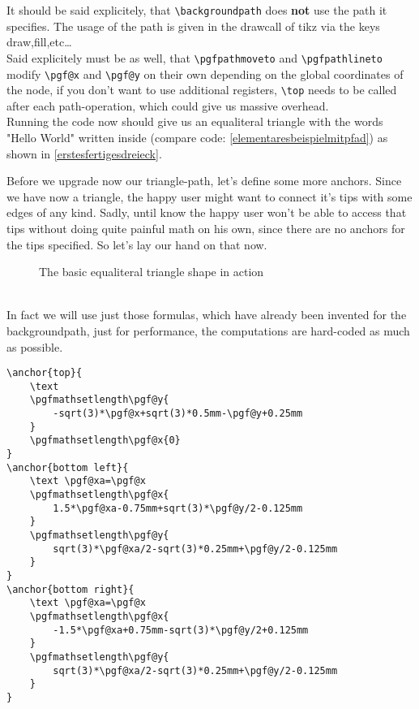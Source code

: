 \documentclass[12pt]{article}
\begin{document}
It should be said explicitely, that \lstinline!\backgroundpath! does \textbf{not} use the path it specifies. The usage of the path is given in the drawcall of tikz via the keys draw,fill,etc\ldots\\
Said explicitely must be as well, that \lstinline!\pgfpathmoveto! and \lstinline!\pgfpathlineto! modify \lstinline$\pgf@x$ and \lstinline$\pgf@y$ on their own depending on the global coordinates of the node, if you don't want to use additional registers, \lstinline!\top! needs to be called after each path-operation, which could give us massive overhead.\\
Running the code now should give us an equaliteral triangle with the words "Hello World" written inside (compare code: \autoref{elementaresbeispielmitpfad}) as shown in \autoref{erstesfertigesdreieck}.\\
\begin{minipage}[l]{\k\textwidth}
Before we upgrade now our triangle-path, let's define some more anchors. Since we have now a triangle, the happy user might want to connect it's tips with some edges of any kind. Sadly, until know the happy user won't be able to access that tips without doing quite painful math on his own, since there are no anchors for the tips specified. So let's lay our hand on that now.
\end{minipage}
\begin{minipage}[r]{\k\textwidth}
\begin{figure}[H]
\centering
{}
\caption{The basic equaliteral triangle shape in action}\label{erstesfertigesdreieck}
\end{figure}
\end{minipage}\\
In fact we will use just those formulas, which have already been invented for the backgroundpath, just for performance, the computations are hard-coded as much as possible.
\begin{lstlisting}[caption=Computing the triangle tips from our saved anchor,label=triangletipanchors]
\anchor{top}{
	\text
	\pgfmathsetlength\pgf@y{
		-sqrt(3)*\pgf@x+sqrt(3)*0.5mm-\pgf@y+0.25mm
	}
	\pgfmathsetlength\pgf@x{0}
}
\anchor{bottom left}{
	\text \pgf@xa=\pgf@x
	\pgfmathsetlength\pgf@x{
		1.5*\pgf@xa-0.75mm+sqrt(3)*\pgf@y/2-0.125mm
	}
	\pgfmathsetlength\pgf@y{
		sqrt(3)*\pgf@xa/2-sqrt(3)*0.25mm+\pgf@y/2-0.125mm
	}
}
\anchor{bottom right}{
	\text \pgf@xa=\pgf@x
	\pgfmathsetlength\pgf@x{
		-1.5*\pgf@xa+0.75mm-sqrt(3)*\pgf@y/2+0.125mm
	}
	\pgfmathsetlength\pgf@y{
		sqrt(3)*\pgf@xa/2-sqrt(3)*0.25mm+\pgf@y/2-0.125mm
	}
}
\end{lstlisting}
\end{document}
